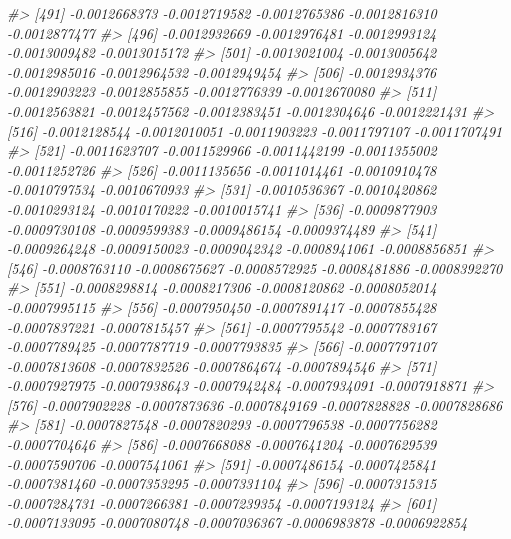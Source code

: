 \documentclass[
]{article}
\newenvironment{Shaded}{\begin{snugshade}}{\end{snugshade}}
\newcommand{\CommentTok}[1]{\textcolor[rgb]{0.56,0.35,0.01}{\textit{#1}}}
\begin{document}
\begin{Shaded}
\begin{Highlighting}[]
\CommentTok{\#\textgreater{} [491] {-}0.0012668373 {-}0.0012719582 {-}0.0012765386 {-}0.0012816310 {-}0.0012877477}
\CommentTok{\#\textgreater{} [496] {-}0.0012932669 {-}0.0012976481 {-}0.0012993124 {-}0.0013009482 {-}0.0013015172}
\CommentTok{\#\textgreater{} [501] {-}0.0013021004 {-}0.0013005642 {-}0.0012985016 {-}0.0012964532 {-}0.0012949454}
\CommentTok{\#\textgreater{} [506] {-}0.0012934376 {-}0.0012903223 {-}0.0012855855 {-}0.0012776339 {-}0.0012670080}
\CommentTok{\#\textgreater{} [511] {-}0.0012563821 {-}0.0012457562 {-}0.0012383451 {-}0.0012304646 {-}0.0012221431}
\CommentTok{\#\textgreater{} [516] {-}0.0012128544 {-}0.0012010051 {-}0.0011903223 {-}0.0011797107 {-}0.0011707491}
\CommentTok{\#\textgreater{} [521] {-}0.0011623707 {-}0.0011529966 {-}0.0011442199 {-}0.0011355002 {-}0.0011252726}
\CommentTok{\#\textgreater{} [526] {-}0.0011135656 {-}0.0011014461 {-}0.0010910478 {-}0.0010797534 {-}0.0010670933}
\CommentTok{\#\textgreater{} [531] {-}0.0010536367 {-}0.0010420862 {-}0.0010293124 {-}0.0010170222 {-}0.0010015741}
\CommentTok{\#\textgreater{} [536] {-}0.0009877903 {-}0.0009730108 {-}0.0009599383 {-}0.0009486154 {-}0.0009374489}
\CommentTok{\#\textgreater{} [541] {-}0.0009264248 {-}0.0009150023 {-}0.0009042342 {-}0.0008941061 {-}0.0008856851}
\CommentTok{\#\textgreater{} [546] {-}0.0008763110 {-}0.0008675627 {-}0.0008572925 {-}0.0008481886 {-}0.0008392270}
\CommentTok{\#\textgreater{} [551] {-}0.0008298814 {-}0.0008217306 {-}0.0008120862 {-}0.0008052014 {-}0.0007995115}
\CommentTok{\#\textgreater{} [556] {-}0.0007950450 {-}0.0007891417 {-}0.0007855428 {-}0.0007837221 {-}0.0007815457}
\CommentTok{\#\textgreater{} [561] {-}0.0007795542 {-}0.0007783167 {-}0.0007789425 {-}0.0007787719 {-}0.0007793835}
\CommentTok{\#\textgreater{} [566] {-}0.0007797107 {-}0.0007813608 {-}0.0007832526 {-}0.0007864674 {-}0.0007894546}
\CommentTok{\#\textgreater{} [571] {-}0.0007927975 {-}0.0007938643 {-}0.0007942484 {-}0.0007934091 {-}0.0007918871}
\CommentTok{\#\textgreater{} [576] {-}0.0007902228 {-}0.0007873636 {-}0.0007849169 {-}0.0007828828 {-}0.0007828686}
\CommentTok{\#\textgreater{} [581] {-}0.0007827548 {-}0.0007820293 {-}0.0007796538 {-}0.0007756282 {-}0.0007704646}
\CommentTok{\#\textgreater{} [586] {-}0.0007668088 {-}0.0007641204 {-}0.0007629539 {-}0.0007590706 {-}0.0007541061}
\CommentTok{\#\textgreater{} [591] {-}0.0007486154 {-}0.0007425841 {-}0.0007381460 {-}0.0007353295 {-}0.0007331104}
\CommentTok{\#\textgreater{} [596] {-}0.0007315315 {-}0.0007284731 {-}0.0007266381 {-}0.0007239354 {-}0.0007193124}
\CommentTok{\#\textgreater{} [601] {-}0.0007133095 {-}0.0007080748 {-}0.0007036367 {-}0.0006983878 {-}0.0006922854}

\end{Highlighting}
\end{Shaded}
\end{document}
